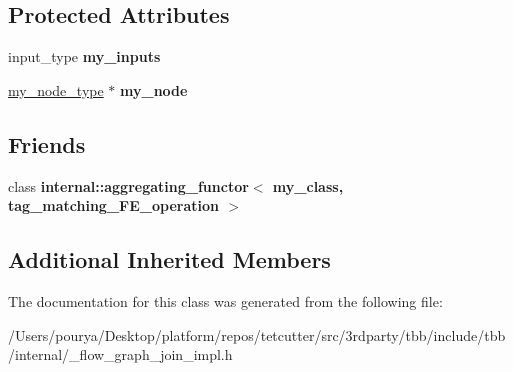 \subsection*{Protected Attributes}
\begin{DoxyCompactItemize}
\item 
\hypertarget{classinternal_1_1join__node__FE_3_01tag__matching_00_01InputTuple_00_01OutputTuple_01_4_a7639389e52d31e200a938c65ff4f2259}{}input\+\_\+type {\bfseries my\+\_\+inputs}\label{classinternal_1_1join__node__FE_3_01tag__matching_00_01InputTuple_00_01OutputTuple_01_4_a7639389e52d31e200a938c65ff4f2259}

\item 
\hypertarget{classinternal_1_1join__node__FE_3_01tag__matching_00_01InputTuple_00_01OutputTuple_01_4_ab093f522b9311e087953af0b877aae60}{}\hyperlink{classinternal_1_1join__node__base}{my\+\_\+node\+\_\+type} $\ast$ {\bfseries my\+\_\+node}\label{classinternal_1_1join__node__FE_3_01tag__matching_00_01InputTuple_00_01OutputTuple_01_4_ab093f522b9311e087953af0b877aae60}

\end{DoxyCompactItemize}
\subsection*{Friends}
\begin{DoxyCompactItemize}
\item 
\hypertarget{classinternal_1_1join__node__FE_3_01tag__matching_00_01InputTuple_00_01OutputTuple_01_4_a3a173424914608c7c73dc851f013016e}{}class {\bfseries internal\+::aggregating\+\_\+functor$<$ my\+\_\+class, tag\+\_\+matching\+\_\+\+F\+E\+\_\+operation $>$}\label{classinternal_1_1join__node__FE_3_01tag__matching_00_01InputTuple_00_01OutputTuple_01_4_a3a173424914608c7c73dc851f013016e}

\end{DoxyCompactItemize}
\subsection*{Additional Inherited Members}


The documentation for this class was generated from the following file\+:\begin{DoxyCompactItemize}
\item 
/\+Users/pourya/\+Desktop/platform/repos/tetcutter/src/3rdparty/tbb/include/tbb/internal/\+\_\+flow\+\_\+graph\+\_\+join\+\_\+impl.\+h\end{DoxyCompactItemize}
